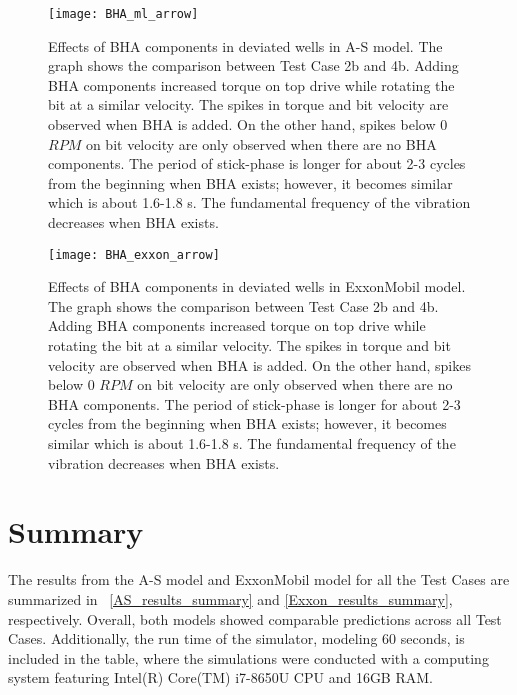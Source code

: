 \begin{figure}
  \centering
  \texttt{[image: BHA\_ml\_arrow]}
  \caption[Effects of BHA components (Matlab model)]{Effects of BHA components in deviated wells in A-S model. The graph shows the comparison between Test Case 2b and 4b. Adding BHA components increased torque on top drive while rotating the bit at a similar velocity. The spikes in torque and bit velocity are observed when BHA is added. On the other hand, spikes below 0 $RPM$ on bit velocity are only observed when there are no BHA components. The period of stick-phase is longer for about 2-3 cycles from the beginning when BHA exists; however, it becomes similar which is about 1.6-1.8 s. The fundamental frequency of the vibration decreases when BHA exists.}\label{figure_BHA_Matlab}
\end{figure}

\begin{figure}
  \centering
  \texttt{[image: BHA\_exxon\_arrow]}
  \caption[Effects of BHA components (ExxonMobil model)]{Effects of BHA components in deviated wells in ExxonMobil model. The graph shows the comparison between Test Case 2b and 4b. Adding BHA components increased torque on top drive while rotating the bit at a similar velocity. The spikes in torque and bit velocity are observed when BHA is added. On the other hand, spikes below 0 $RPM$ on bit velocity are only observed when there are no BHA components. The period of stick-phase is longer for about 2-3 cycles from the beginning when BHA exists; however, it becomes similar which is about 1.6-1.8 s. The fundamental frequency of the vibration decreases when BHA exists.}\label{figure_BHA_EXXON}
\end{figure}

\section{Summary} 
The results from the A-S model and ExxonMobil model for all the Test Cases are summarized in \tablename~\ref{AS_results_summary} and \ref{Exxon_results_summary}, respectively. Overall, both models showed comparable predictions across all Test Cases. Additionally, the run time of the simulator, modeling 60 seconds, is included in the table, where the simulations were conducted with a computing system featuring Intel(R) Core(TM) i7-8650U CPU and 16GB RAM. 

